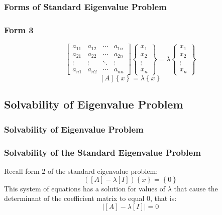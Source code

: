 \documentclass[fleqn]{beamer} %
\newcommand{\sectionIIsubsectionItitle}{Forms of Standard Eigenvalue Problem}
\newcommand{\sectionIIsubsectionIItitle}{Solvability of Eigenvalue Problem}
\begin{document}
		\begin{frame}[label=sectionIIsubsectionI]
				\frametitle{\sectionIIsubsectionItitle}
				\bigskip

				 \frametitle{Form 3}
  \begin{displaymath}
    \left[ \begin{array}{cccc}
        a_{11} & a_{12} & \cdots & a_{1n} \\
        a_{21} & a_{22} & \cdots & a_{2n} \\
        \vdots & \vdots & \ddots & \vdots \\
        a_{n1} & a_{n2} & \cdots & a_{nn}
      \end{array} \right]
    \left\{ \begin{array}{c}
        x_1 \\
        x_2 \\
        \vdots \\
        x_n
      \end{array} \right\} =
    \lambda
    \left\{ \begin{array}{c}
        x_1 \\
        x_2 \\
        \vdots \\
        x_n
      \end{array} \right\}
  \end{displaymath}
  \begin{displaymath}
    \left[ A \right] \left\{ x \right\} = \lambda \left\{ x \right\}
  \end{displaymath}
			
				\btVFill
			\end{frame}

		\subsection{\sectionIIsubsectionIItitle}\label{sectionIIsubsectionII}

			\begin{frame}
				\frametitle{\sectionIIsubsectionIItitle} \small
				\bigskip

				  \frametitle{Solvability of the Standard Eigenvalue Problem}
				  Recall form 2 of the standard eigenvalue problem:
				  \begin{displaymath}
				    \left( \left[A\right] - \lambda \left[ I \right] \right) \left\{ x \right\} = \left\{ 0 \right\}
				  \end{displaymath}
				  This system of equations has a solution for values of $\lambda$ that
				  cause the determinant of the coefficient matrix to equal 0, that is:
				  \begin{displaymath}
				    \left| \left[ A \right] - \lambda \left[ I \right] \right| = 0
				  \end{displaymath}

				\btVFill 
			\end{frame}	
\end{document}
